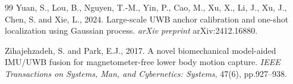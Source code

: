 \documentclass[11pt,a4paper]{article}
\begin{document}
\begin{thebibliography}{99}
 Yuan, S., Lou, B., Nguyen, T.-M., Yin, P., Cao, M., Xu, X., Li, J., Xu, J., Chen, S. and Xie, L.,
2024. Large-scale UWB anchor calibration and one-shot localization using Gaussian process.
\emph{arXiv preprint} arXiv:2412.16880.

 Zihajehzadeh, S. and Park, E.J., 2017. A
novel biomechanical model-aided IMU/UWB fusion for magnetometer-free lower body motion capture.
\emph{IEEE Transactions on Systems, Man, and Cybernetics: Systems}, 47(6), pp.927--938.

\end{thebibliography}
\end{document}
